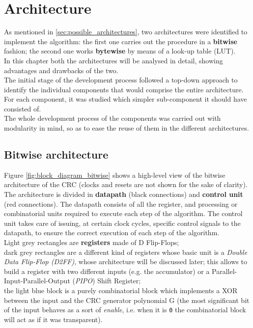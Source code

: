 %
\chapter{Architecture}\label{ch:architecture}

As mentioned in \ref{sec:possible_architectures}, two architectures were identified to implement the algorithm: the first one carries out the procedure in a \textbf{bitwise} fashion; the second one works \textbf{bytewise} by means of a look-up table (LUT).\\
In this chapter both the architectures will be analysed in detail, showing advantages and drawbacks of the two.\\
The initial stage of the development process followed a top-down approach to identify the individual components that would comprise the entire architecture. For each component, it was studied which simpler sub-component it should have consisted of.\\
The whole development process of the components was carried out with modularity in mind, so as to ease the reuse of them in the different architectures.\\


\section{Bitwise architecture}\label{sec:bitwise_arch}

Figure \ref{fig:block_diagram_bitwise} shows a high-level view of the bitwise architecture of the CRC (clocks and resets are not shown for the sake of clarity).\\
The architecture is divided in \textbf{datapath} (black connections) and \textbf{control unit} (red connections). The datapath consists of all the register, and processing or combinatorial units required to execute each step of the algorithm. The control unit takes care of issuing, at certain clock cycles, specific control signals to the datapath, to ensure the correct execution of each step of the algorithm.\\
\hfill \break
Light grey rectangles are \textbf{registers} made of D Flip-Flops;\\
dark grey rectangles are a different kind of registers whose basic unit is a \textit{Double Data Flip-Flop (D2FF)}, whose architecture will be discussed later; this allows to build a register with two different inputs (e.g. the accumulator) or a Parallel-Input-Parallel-Output (\textit{PIPO}) Shift Register;\\
the light blue block is a purely combinatorial block which implements a XOR between the input and the CRC generator polynomial G (the most significant bit of the input behaves as a sort of \textit{enable}, i.e. when it is \texttt{0} the combinatorial block will act as if it was transparent).\\

